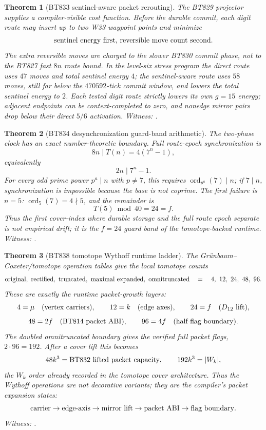 \documentclass[11pt]{article}
\newtheorem{theorem}{Theorem}[section]
\begin{document}
\begin{theorem}[BT833 sentinel-aware packet rerouting]
The BT829 projector supplies a compiler-visible cost function.  Before
the durable commit, each digit route may insert up to two W33 waypoint
points and minimize
\[
\hbox{sentinel energy first, reversible move count second}.
\]
The extra reversible moves are charged to the slower BT830 commit
phase, not to the BT827 fast $8n$ route bound.  In the level-six stress
program the direct route uses $47$ moves and total sentinel energy $4$;
the sentinel-aware route uses $58$ moves, still far below the
$470592$-tick commit window, and lowers the total sentinel energy to
$2$.  Each tested digit route strictly lowers its own $g=15$ energy;
adjacent endpoints can be context-completed to zero, and nonedge mirror
pairs drop below their direct $5/6$ activation.
\emph{Witness: .}
\end{theorem}

\begin{theorem}[BT834 desynchronization guard-band arithmetic]
The two-phase clock has an exact number-theoretic boundary.  Full
route-epoch synchronization is
\[
8n\mid T(n)=4(7^n-1),
\]
equivalently
\[
2n\mid 7^n-1.
\]
For every odd prime power $p^a\mid n$ with $p\ne7$, this requires
$\operatorname{ord}_{p^a}(7)\mid n$; if $7\mid n$, synchronization is
impossible because the base is not coprime.  The first failure is
$n=5$: $\operatorname{ord}_5(7)=4\nmid5$, and the remainder is
\[
T(5)\bmod 40=24=f.
\]
Thus the first cover-index where durable storage and the full route
epoch separate is not empirical drift; it is the $f=24$ guard band of
the tomotope-backed runtime.
\emph{Witness: .}
\end{theorem}

\begin{theorem}[BT838 tomotope Wythoff runtime ladder]
The Gr\"unbaum--Coxeter/tomotope operation tables give the local
tomotope counts
\[
\hbox{original},\ \hbox{rectified},\ \hbox{truncated},\
\hbox{maximal expanded},\ \hbox{omnitruncated}
\quad=\quad
4,\ 12,\ 24,\ 48,\ 96.
\]
These are exactly the runtime packet-growth layers:
\[
4=\mu\quad(\hbox{vertex carriers}),\qquad
12=k\quad(\hbox{edge axes}),\qquad
24=f\quad(\hbox{$D_{12}$ lift}),
\]
\[
48=2f\quad(\hbox{BT814 packet ABI}),\qquad
96=4f\quad(\hbox{half-flag boundary}).
\]
The doubled omnitruncated boundary gives the verified full packet
flags, $2\cdot96=192$.  After a cover lift this becomes
\[
48k^3=\hbox{BT832 lifted packet capacity},\qquad
192k^3=|W_k|,
\]
the $W_k$ order already recorded in the tomotope cover architecture.
Thus the Wythoff operations are not decorative variants; they are the
compiler's packet expansion states:
\[
\hbox{carrier}\to\hbox{edge-axis}\to\hbox{mirror lift}
\to\hbox{packet ABI}\to\hbox{flag boundary}.
\]
\emph{Witness: .}
\end{theorem}
\end{document}
